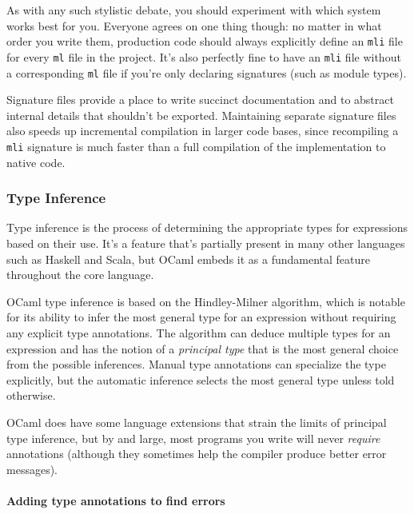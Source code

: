 As with any such stylistic debate, you should experiment with which
system works best for you. Everyone agrees on one thing though: no
matter in what order you write them, production code should always
explicitly define an \passthrough{\lstinline!mli!} file for every
\passthrough{\lstinline!ml!} file in the project. It's also perfectly
fine to have an \passthrough{\lstinline!mli!} file without a
corresponding \passthrough{\lstinline!ml!} file if you're only declaring
signatures (such as module types).

Signature files provide a place to write succinct documentation and to
abstract internal details that shouldn't be exported. Maintaining
separate signature files also speeds up incremental compilation in
larger code bases, since recompiling a \passthrough{\lstinline!mli!}
signature is much faster than a full compilation of the implementation
to native code.

\hypertarget{type-inference-1}{%
\subsubsection{Type Inference}\label{type-inference-1}}

Type inference is the process of determining the appropriate types for
expressions based on their use. It's a feature that's partially present
in many other languages such as Haskell and Scala, but OCaml embeds it
as a fundamental feature throughout the core language.

OCaml type inference is based on the Hindley-Milner algorithm, which is
notable for its ability to infer the most general type for an expression
without requiring any explicit type annotations. The algorithm can
deduce multiple types for an expression and has the notion of a
\emph{principal type} that is the most general choice from the possible
inferences. Manual type annotations can specialize the type explicitly,
but the automatic inference selects the most general type unless told
otherwise.

OCaml does have some language extensions that strain the limits of
principal type inference, but by and large, most programs you write will
never \emph{require} annotations (although they sometimes help the
compiler produce better error messages).

\hypertarget{adding-type-annotations-to-find-errors}{%
\paragraph{Adding type annotations to find
errors}\label{adding-type-annotations-to-find-errors}}

